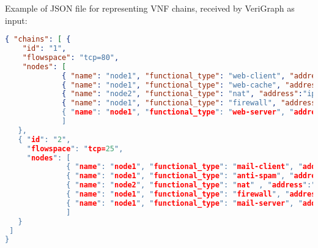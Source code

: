 Example of JSON file for representing VNF chains, received by VeriGraph as input:
\begin{lstlisting}[language=json,firstnumber=1]
{ "chains": [ {
    "id": "1",
    "flowspace": "tcp=80",
    "nodes": [
             { "name": "node1", "functional_type": "web-client", "address":"ip_webClient" },
             { "name": "node1", "functional_type": "web-cache", "address":"ip_webCache" },
             { "name": "node2", "functional_type": "nat", "address":"ip_nat" },
             { "name": "node1", "functional_type": "firewall", "address":"ip_firewall },
             { "name": "node1", "functional_type": "web-server", "address":"ip_webServer" }
             ]
   },
   { "id": "2",
     "flowspace": "tcp=25",
     "nodes": [
              { "name": "node1", "functional_type": "mail-client", "address":"ip_mailClient" },
              { "name": "node1", "functional_type": "anti-spam", "address":"ip_spam" },
              { "name": "node2", "functional_type": "nat" , "address":"ip_nat"},
              { "name": "node1", "functional_type": "firewall", "address":"ip_firewall" },
              { "name": "node1", "functional_type": "mail-server", "address":"ip_mailServer" }
              ]
   }
 ]
}
\end{lstlisting}
